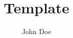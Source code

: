 \documentclass[notitlepage]{article}
\title{Template}
\author{John Doe}
\begin{document}
\cite{*}


\end{document}
